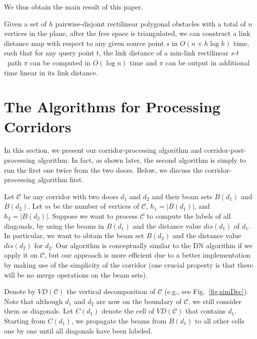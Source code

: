 \documentclass[english,runningheads,11pt]{llncs-revised}
\def\calC{\mathcal{C}}
\def\st{$s$-$t$}
\newcommand{\vtd}{\mbox{$V\!D$}}
\begin{document}
We thus obtain the main result of this paper.


\begin{theorem}
Given a set of $h$ pairwise-disjoint rectilinear polygonal obstacles with a total of $n$ vertices in the plane, after the free space is triangulated,
we can construct a link distance map with respect to any given source point $s$ in $O(n+h\log h)$ time, such that
for any query point $t$, the link distance of a min-link rectilinear \st\ path $\pi$ can be computed in $O(\log n)$ time
and $\pi$ can be output in additional time linear in its link distance.
\end{theorem}


\section{The Algorithms for Processing Corridors}
\label{sec:algocorridor}

In this section, we present our corridor-processing algorithm and
corridor-post-processing algorithm. In fact, as shown later, the second algorithm is
simply to run the first one twice from the two doors. Below, we discuss the
corridor-processing algorithm first.





Let $\calC$ be any corridor with two doors $d_1$ and $d_2$ and
their beam sets $B(d_1)$ and $B(d_2)$. Let $m$ be the number of vertices of $\calC$,
$h_1=|B(d_1)|$, and $h_2=|B(d_2)|$.
Suppose we
want to process $\calC$  to compute the labels of all diagonals,
by using the beams in $B(d_1)$ and the distance
value $dis(d_1)$ of $d_1$. In particular,
we want to obtain the beam set $B(d_2)$ and the distance value
$dis(d_2)$ for $d_2$.
Our algorithm is conceptually similar to the DN algorithm if we apply
it on $\calC$, but our approach is more efficient due to a better implementation by making
use of the simplicity of the corridor (one crucial property is that there will be no merge
operations on the beam sets).



Denote by $\vtd(\calC)$ the vertical decomposition of $\calC$ (e.g.,
see Fig.~\ref{fig:simDec}). Note that although $d_1$ and $d_2$ are
now on the boundary of $\calC$, we still consider them as diagonals.
Let $C(d_1)$ denote the cell of $\vtd(\calC)$ that contains $d_1$.
Starting from $C(d_1)$, we
propagate the beams from $B(d_1)$ to all other cells one by one until
all diagonals have been labeled.
\end{document}
